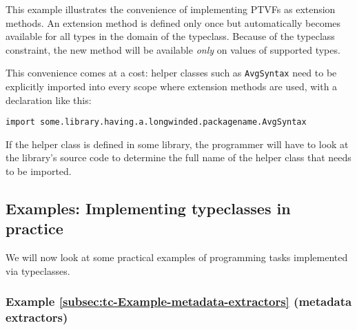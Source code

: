 This example illustrates the convenience of implementing PTVFs as
extension methods. An extension method is defined only once but automatically
becomes available for all types in the domain of the typeclass. Because
of the typeclass constraint, the new method will be available \emph{only}
on values of supported types.

This convenience comes at a cost: helper classes such as \lstinline!AvgSyntax!
need to be explicitly imported into every scope where extension methods
are used, with a declaration like this:
\begin{lstlisting}
import some.library.having.a.longwinded.packagename.AvgSyntax
\end{lstlisting}
If the helper class is defined in some library, the programmer will
have to look at the library\textsf{'}s source code to determine the full name
of the helper class that needs to be imported.

\subsection{Examples: Implementing typeclasses in practice}

We will now look at some practical examples of programming tasks implemented
via typeclasses.

\subsubsection{Example \label{subsec:tc-Example-metadata-extractors}\ref{subsec:tc-Example-metadata-extractors}
(metadata extractors)}

